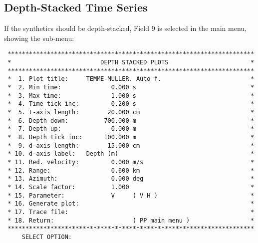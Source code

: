 \newpage
\subsection{Depth-Stacked Time Series}

If  the 
synthetics  should be depth-stacked, Field 9 is selected in the main
menu,  showing  the sub-menu:

\small
\begin{verbatim} 
 *********************************************************************
 *                         DEPTH STACKED PLOTS                       *
 *********************************************************************
 *  1. Plot title:     TEMME-MULLER. Auto f.                         *
 *  2. Min time:              0.000 s                                *
 *  3. Max time:              1.000 s                                *
 *  4. Time tick inc:         0.200 s                                *
 *  5. t-axis length:        20.000 cm                               *
 *  6. Depth down:          700.000 m                                *
 *  7. Depth up:              0.000 m                                *
 *  8. Depth tick inc:      100.000 m                                *
 *  9. d-axis length:        15.000 cm                               *
 * 10. d-axis label:   Depth (m)                                     *
 * 11. Red. velocity:         0.000 m/s                              *
 * 12. Range:                 0.600 km                               *
 * 13. Azimuth:               0.000 deg                              *
 * 14. Scale factor:          1.000                                  *
 * 15. Parameter:             V     ( V H )                          *
 * 16. Generate plot:                                                *
 * 17. Trace file:                                                   *
 * 18. Return:                      ( PP main menu )                 *
 *********************************************************************
     SELECT OPTION: 
\end{verbatim} 
\normalsize

